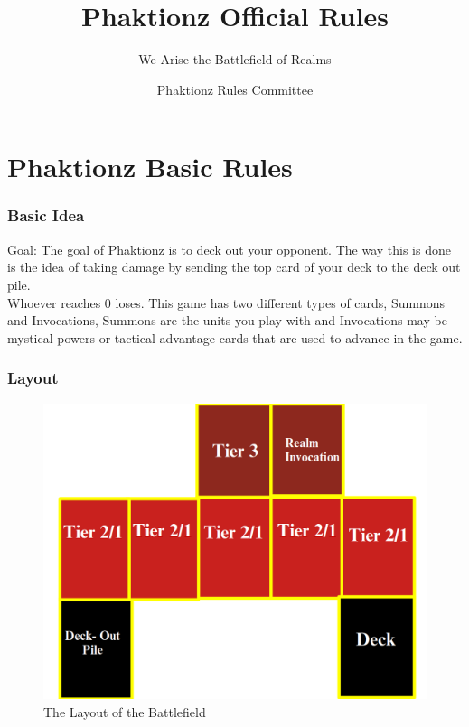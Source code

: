 \documentclass{beamer}
\title[Phaktionz Official Rules] %
{Phaktionz Official Rules}
\subtitle{We Arise the Battlefield of Realms}
\author[Phaktionz Rules Committee] %
{Phaktionz Rules Committee}
\institute[] %
{\inst{Casual Card Cafe}}
\date[] %
\begin{document}
\frame{\titlepage}


\section{Phaktionz Basic Rules}
\begin{frame}
    \frametitle{Basic Idea}
    \textrm{Goal: The goal of Phaktionz is to deck out your opponent. The way this is done is the idea of taking damage 
    by sending the top card of your deck to the deck out pile. \\Whoever reaches 0 loses. This game has two different 
    types of cards, Summons and Invocations, Summons are the units you play with and Invocations may be mystical powers
    or tactical advantage cards that are used to advance in the game.}
\end{frame}


\begin{frame}
    \frametitle{Layout}
    \begin{figure}
        \includegraphics[scale=0.22]{images/field.png}
        \caption{\textrm{The Layout of the Battlefield}}
    \end{figure}
\end{frame}
\end{document}
